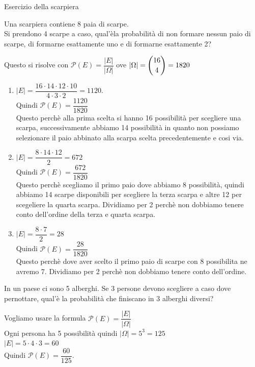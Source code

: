 \documentclass[12pt]{report}
\newcounter{exercise}
\newcommand{\nmu}{}
\begin{document}
	\begin{exercise}{\nmu Esercizio della scarpiera}{}
		\begin{assignment}{}{}
			Una scarpiera contiene 8 paia di scarpe. \\
			Si prendono 4 scarpe a caso, qual'èla probabilità di non formare nessun paio di scarpe, di formarne esattamente uno e di formarne esattamente 2?
		\end{assignment}
		Questo si risolve con $\mathcal{P}(E) = \dfrac{|E|}{|\Omega|}$ ove $|\Omega| = \mathlarger{\binom{16}{4}} = 1820$
		\begin{enumerate}
			\item $|E| = \dfrac{16 \cdot 14 \cdot 12 \cdot 10}{4 \cdot 3 \cdot 2} = 1120$. \\
			Quindi $\mathcal{P}(E) = \dfrac{1120}{1820}$ \\
			Questo perchè alla prima scelta si hanno 16 possibilità per scegliere una scarpa, successivamente abbiamo 14 possibilità in quanto non possiamo selezionare il paio abbinato alla scarpa scelta precedentemente e cosi via.
			\item $|E| = \dfrac{8 \cdot 14 \cdot 12}{2} = 672$ \\
			Quindi $\mathcal{P}(E) = \dfrac{672}{1820}$ \\
			Questo perchè scegliamo il primo paio dove abbiamo 8 possibilità, quindi abbiamo 14 scarpe disponibili per scegliere la terza scarpa e altre 12 per scegeliere la quarta scarpa. Dividiamo per 2 perchè non dobbiamo tenere conto dell'ordine della terza e quarta scarpa.
			\item $|E| = \dfrac{8 \cdot 7}{2} = 28$ \\
			Quindi $\mathcal{P}(E) = \dfrac{28}{1820}$ \\
			Questo perchè dove aver scelto il primo paio di scarpe con 8 possibilita ne avremo 7. Dividiamo per 2 perchè non dobbiamo tenere conto dell'ordine.
		\end{enumerate}
	\end{exercise}
	\begin{exercise}{}{}
		\begin{assignment}{}{}
			In un paese ci sono 5 alberghi. Se 3 persone devono scegliere a caso dove pernottare, qual'è la probabilità che finiscano in 3 alberghi diversi?
		\end{assignment}
		Vogliamo usare la formula $\mathcal{P}(E) = \dfrac{|E|}{|\Omega|}$ \\
		Ogni persona ha 5 possibilità quindi $|\Omega| = 5^3 = 125$ \\
		$|E| = 5 \cdot 4 \cdot 3 = 60$ \\
		Quindi $\mathcal{P}(E) = \dfrac{60}{125}$.
	\end{exercise}
\end{document}
